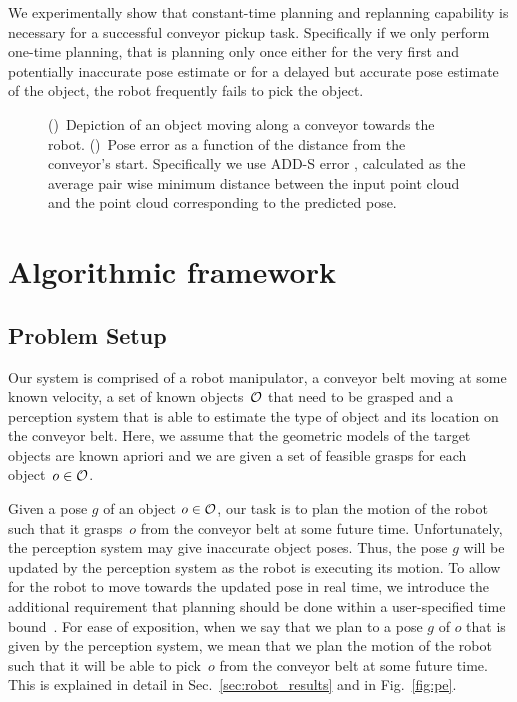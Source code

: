 \documentclass[a4paper]{report}
\begin{document}
%
We experimentally show that constant-time planning and replanning capability is necessary for a successful conveyor pickup task. Specifically if we only perform one-time planning, that is planning only once either for the very first and potentially inaccurate pose estimate or for a delayed but accurate pose estimate of the object, the robot frequently fails to pick the object.
\begin{figure}[t]
    \centering
    \begin{subfigure}{.49\textwidth}
        \caption{}
        \label{fig:obj1}
    \end{subfigure}
    \begin{subfigure}{0.49\textwidth}
        \caption{}
        \label{fig:obj2}
    \end{subfigure}
    \caption{
    \CaptionTextSize
    ()~Depiction of an object moving along a conveyor towards the robot.
    ()~Pose error as a function of the distance from the conveyor's start. Specifically we use ADD-S error \cite{add_metric},
    calculated as the average pair wise minimum distance between the input point cloud and the point cloud corresponding to the predicted pose.
    }
    \label{fig:pose_sequence}
\end{figure}

\section{Algorithmic framework}
\subsection{Problem Setup}
Our system is comprised of 
a robot manipulator,
a conveyor belt moving at some known velocity,
a set of known objects~$\mathcal{O}$ that need to be grasped and 
a perception system that is able to estimate the type of object and its location on the conveyor belt. Here, we assume that the geometric models of the target objects are known apriori and we are given a set of feasible grasps for each object~$o \in \mathcal{O}$.

Given a pose $g$ of an object $o \in \mathcal{O}$, our task is to plan the motion of the robot such that it grasps~$o$ from the conveyor belt at some future time.
%
Unfortunately, the perception system may give inaccurate object poses.
Thus, the pose $g$ will be updated by the perception system as the robot is executing its motion. 
To allow for the robot to move towards the updated pose in real time, we introduce the additional requirement that planning should be done within a user-specified time bound~\Tbound.
%
For ease of exposition, when we say that we plan to a pose $g$ of $o$ that is given by the perception system, 
we mean that we plan the motion of the robot such that it will be able to pick~$o$ from the conveyor belt at some future time. 
This is explained in detail in Sec.~\ref{sec:robot_results} and in Fig.~\ref{fig:pe}.
\end{document}

